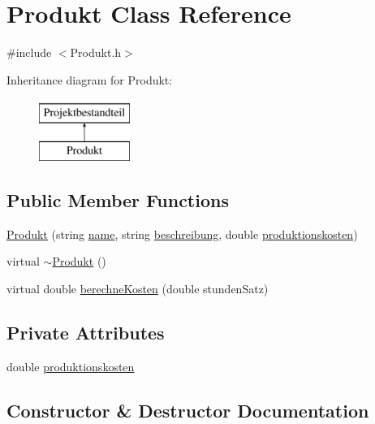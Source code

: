 \hypertarget{classProdukt}{}\section{Produkt Class Reference}
\label{classProdukt}


{\ttfamily \#include $<$Produkt.\+h$>$}

Inheritance diagram for Produkt\+:\begin{figure}[H]
\begin{center}
\leavevmode
\includegraphics[height=2.000000cm]{classProdukt}
\end{center}
\end{figure}
\subsection*{Public Member Functions}
\begin{DoxyCompactItemize}
\item 
\hyperlink{classProdukt_a9baacb2e08b3cc4a7dd951810702bd67}{Produkt} (string \hyperlink{classProjektbestandteil_a3592f75d5870371bd87c9a057f31241e}{name}, string \hyperlink{classProjektbestandteil_a68c5cc53ee0c402c82e333493f460ecb}{beschreibung}, double \hyperlink{classProdukt_ad7901109c0a1ec4ac65fd898d6d8405b}{produktionskosten})
\item 
virtual \hyperlink{classProdukt_aa73d71caf7d4e9c8590f726faf263290}{$\sim$\+Produkt} ()
\item 
virtual double \hyperlink{classProdukt_aec53e84c49b971d78cf4b7881afc8c20}{berechne\+Kosten} (double stunden\+Satz)
\end{DoxyCompactItemize}
\subsection*{Private Attributes}
\begin{DoxyCompactItemize}
\item 
double \hyperlink{classProdukt_ad7901109c0a1ec4ac65fd898d6d8405b}{produktionskosten}
\end{DoxyCompactItemize}


\subsection{Constructor \& Destructor Documentation}
\hypertarget{classProdukt_a9baacb2e08b3cc4a7dd951810702bd67}{}
